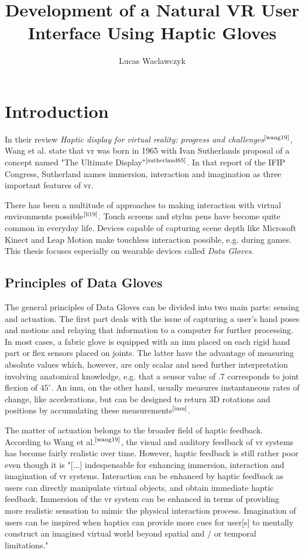 \documentclass[hyperref, bachelorofscience]{cgvpub}
\author{Lucas Waclawczyk}
\title{Development of a Natural VR User Interface Using Haptic Gloves}
\newcommand{\newcite}[1]{$ ^{\text{\cite{#1}}} $}
\begin{document}
\glsaddall
	
\chapter{Introduction}
In their review \emph{Haptic display for virtual reality: progress and challenges}\newcite{wang19}, Wang et al. state that \gls{vr} was born in 1965 with Ivan Sutherlands proposal of a concept named "The Ultimate Display"\newcite{sutherland65}. In that report of the IFIP Congress, Sutherland names immersion, interaction and imagination as three important features of \acrshort{vr}. 

There has been a multitude of approaches to making interaction with virtual environments possible\newcite{li19}. Touch screens and stylus pens have become quite common in everyday life. Devices capable of capturing scene depth like Microsoft Kinect and Leap Motion make touchless interaction possible, e.g. during games. This thesis focuses especially on wearable devices called \emph{Data Gloves}.

\section{Principles of Data Gloves}
The general principles of Data Gloves can be divided into two main parts: sensing and actuation. The first part deals with the issue of capturing a user's hand poses and motions and relaying that information to a computer for further processing. In most cases, a fabric glove is equipped with an \acrfull{imu} placed on each rigid hand part or flex sensors placed on joints. The latter have the advantage of measuring absolute values which, however, are only scalar and need further interpretation involving anatomical knowledge, e.g. that a sensor value of $ .7 $ corresponds to joint flexion of $ 45^{\circ} $. An \acrfull{imu}, on the other hand, usually measures instantaneous rates of change, like accelerations, but can be designed to return 3D rotations and positions by accumulating these measurements\newcite{imu}.

The matter of actuation belongs to the broader field of haptic feedback. According to Wang et al.\newcite{wang19}, the visual and auditory feedback of \acrshort{vr} systems has become fairly realistic over time. However, haptic feedback is still rather poor even though it is "[$\dots$] indespensable for enhancing immersion, interaction and imagination of \acrshort{vr} systems. Interaction can be enhanced by haptic feedback as users can directly manipulate virtual objects, and obtain immediate haptic feedback. Immersion of the \acrshort{vr} system can be enhanced in terms of providing more realistic sensation to mimic the physical interaction process. Imagination of users can be inspired when haptics can provide more cues for user[s] to mentally construct an imagined virtual world beyond spatial and / or temporal limitations."
\end{document}
